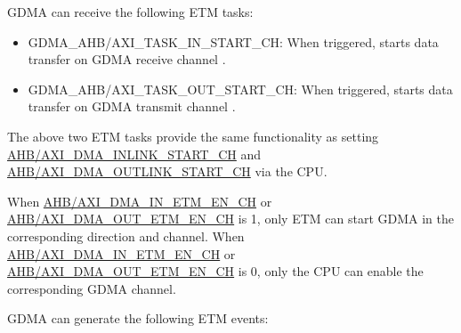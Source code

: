 \documentclass[main\_\_EN.tex]{subfiles}
\begin{document}
GDMA can receive the following ETM tasks:

\begin{itemize}
    \item GDMA\_AHB/AXI\_TASK\_IN\_START\_CH: When triggered, starts data transfer on GDMA receive channel .
    \item GDMA\_AHB/AXI\_TASK\_OUT\_START\_CH: When triggered, starts data transfer on GDMA transmit channel .
\end{itemize}

\begin{tiplisting}
The above two ETM tasks provide the same functionality as setting \hyperref[fielddesc:AHBDMAINLINKSTARTCHN]{AHB/AXI\_DMA\_INLINK\_START\_CH} and \\\hyperref[fielddesc:AHBDMAOUTLINKSTARTCHN]{AHB/AXI\_DMA\_OUTLINK\_START\_CH} via the CPU.

When \hyperref[fielddesc:AHBDMAINETMENCHN]{AHB/AXI\_DMA\_IN\_ETM\_EN\_CH} or \hyperref[fielddesc:AHBDMAOUTETMENCHN]{AHB/AXI\_DMA\_OUT\_ETM\_EN\_CH} is 1, only ETM can start GDMA in the corresponding direction and channel. When \hyperref[fielddesc:AHBDMAINETMENCHN]{AHB/AXI\_DMA\_IN\_ETM\_EN\_CH} or \hyperref[fielddesc:AHBDMAOUTETMENCHN]{AHB/AXI\_DMA\_OUT\_ETM\_EN\_CH} is 0, only the CPU can enable the corresponding GDMA channel.
\end{tiplisting}

GDMA can generate the following ETM events:
\end{document}
